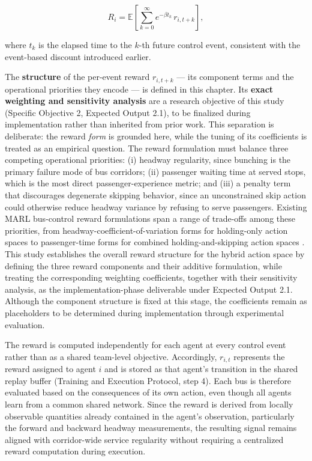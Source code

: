 \begin{equation}
R_i = \mathbb{E}\!\left[\sum_{k=0}^{\infty} e^{-\beta t_k}\, r_{i, t+k}\right],
\end{equation}

where $t_k$ is the elapsed time to the $k$-th future control event, consistent with the event-based discount introduced earlier.

The \textbf{structure} of the per-event reward $r_{i, t+k}$ --- its component terms and the operational priorities they encode --- is defined in this chapter. Its \textbf{exact weighting and sensitivity analysis} are a research objective of this study (Specific Objective 2, Expected Output 2.1), to be finalized during implementation rather than inherited from prior work. This separation is deliberate: the reward \textit{form} is grounded here, while the tuning of its coefficients is treated as an empirical question. The reward formulation must balance three competing operational priorities: (i) headway regularity, since bunching is the primary failure mode of bus corridors; (ii) passenger waiting time at served stops, which is the most direct passenger-experience metric; and (iii) a penalty term that discourages degenerate skipping behavior, since an unconstrained skip action could otherwise reduce headway variance by refusing to serve passengers. Existing MARL bus-control reward formulations span a range of trade-offs among these priorities, from headway-coefficient-of-variation forms for holding-only action spaces \cite{Wangsun,Wang2023MultiObj} to passenger-time forms for combined holding-and-skipping action spaces \cite{Rodriguez2023Cooperative}. This study establishes the overall reward structure for the hybrid action space by defining the three reward components and their additive formulation, while treating the corresponding weighting coefficients, together with their sensitivity analysis, as the implementation-phase deliverable under Expected Output 2.1. Although the component structure is fixed at this stage, the coefficients remain as placeholders to be determined during implementation through experimental evaluation.

The reward is computed independently for each agent at every control event rather than as a shared team-level objective. Accordingly, $r_{i,t}$ represents the reward assigned to agent $i$ and is stored as that agent's transition in the shared replay buffer (Training and Execution Protocol, step 4). Each bus is therefore evaluated based on the consequences of its own action, even though all agents learn from a common shared network. Since the reward is derived from locally observable quantities already contained in the agent's observation, particularly the forward and backward headway measurements, the resulting signal remains aligned with corridor-wide service regularity without requiring a centralized reward computation during execution.

